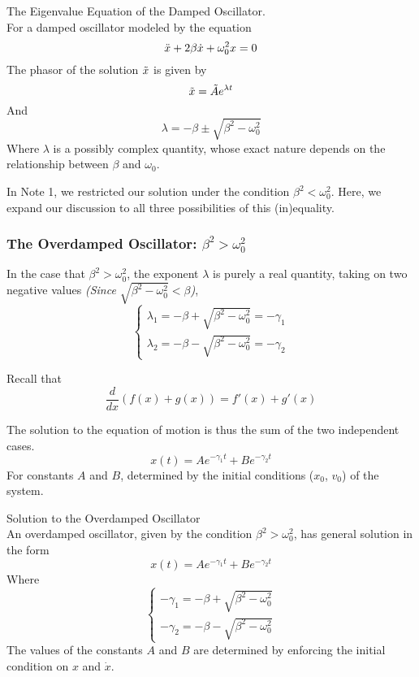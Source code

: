 \documentclass[11pt]{article}
\theoremstyle{gangnamstyle}{\newtheorem{definition}{Definition}[]}
\theoremstyle{gangnamstyle}{\newtheorem{example}{Example}[]}
\theoremstyle{gangnamstyle}{\newtheorem{problem}{Problem}[]}
\theoremstyle{gangnamstyle}{\newtheorem{warning}{Warning}[]}
\begin{document}
\begin{definition}
The Eigenvalue Equation of the Damped Oscillator. \\
For a damped oscillator modeled by the equation
\begin{equation}
\Ddot{x} + 2\beta\Dot{x} + \omega_0^2x = 0
\end{equation}
The phasor of the solution $\Tilde{x}$ is given by
\begin{equation}
\Tilde{x} = \Tilde{A}e^{\lambda t}
\end{equation}
And
\begin{equation}
\lambda = -\beta \pm \sqrt{\beta^2 - \omega_0^2}
\end{equation}
Where $\lambda$ is a possibly complex quantity, whose exact nature depends on the relationship between $\beta$ and $\omega_0$. 
\end{definition}

In Note 1, we restricted our solution under the condition $\beta^2 < \omega_0^2$. Here, we expand our discussion to all three possibilities of this (in)equality. 

\subsubsection{The Overdamped Oscillator: $\beta^2 > \omega_0^2$}

In the case that $\beta^2 > \omega_0^2$, the exponent $\lambda$ is purely a real quantity, taking on two negative values \textit{(Since $\sqrt{\beta^2 - \omega_0^2} < \beta$)}, 
\[ \begin{cases}
\lambda_1 = -\beta + \sqrt{\beta^2 - \omega_0^2} = - \gamma_1 \\
\lambda_2 = -\beta - \sqrt{\beta^2 - \omega_0^2} = - \gamma_2
\end{cases} \]

Recall that
\[ \frac{d}{dx}(f(x) + g(x)) = f'(x) + g'(x) \]

The solution to the equation of motion is thus the sum of the two independent cases. 
\[ x(t) = Ae^{-\gamma_1t} + Be^{-\gamma_2t} \]
For constants $A$ and $B$, determined by the initial conditions ($x_0$, $v_0$) of the system. 

\begin{definition}
Solution to the Overdamped Oscillator \\
An overdamped oscillator, given by the condition $\beta^2 > \omega_0^2$, has general solution in the form
\begin{equation}
x(t) = Ae^{-\gamma_1t} + Be^{-\gamma_2t}
\end{equation}
Where
\[ \begin{cases}
- \gamma_1 = -\beta + \sqrt{\beta^2 - \omega_0^2} \\
- \gamma_2 = -\beta - \sqrt{\beta^2 - \omega_0^2}
\end{cases} \]
The values of the constants $A$ and $B$ are determined by enforcing the initial condition on $x$ and $\Dot{x}$.
\end{definition}
\end{document}
